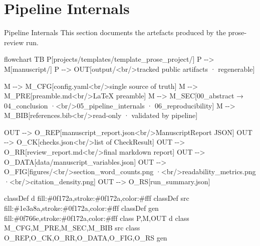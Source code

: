 \documentclass[
  ignorenonframetext,
]{beamer}
\author{\texorpdfstring{}{}}
\date{}
\newenvironment{Shaded}{}{}
\newcommand{\NormalTok}[1]{#1}
\begin{document}
\section{Pipeline Internals}\label{sec:pipeline_internals}

\begin{frame}{Pipeline Internals}
This section documents the artefacts produced by the prose-review run.

\begin{Shaded}
\begin{Highlighting}[]
\NormalTok{flowchart TB}
\NormalTok{    P[projects/templates/template\_prose\_project/]}
\NormalTok{    P {-}{-}\textgreater{} M[manuscript/]}
\NormalTok{    P {-}{-}\textgreater{} OUT[output/\textless{}br/\textgreater{}tracked public artifacts · regenerable]}

\NormalTok{    M {-}{-}\textgreater{} M\_CFG[config.yaml\textless{}br/\textgreater{}single source of truth]}
\NormalTok{    M {-}{-}\textgreater{} M\_PRE[preamble.md\textless{}br/\textgreater{}LaTeX preamble]}
\NormalTok{    M {-}{-}\textgreater{} M\_SEC[00\_abstract → 04\_conclusion ·\textless{}br/\textgreater{}05\_pipeline\_internals · 06\_reproducibility]}
\NormalTok{    M {-}{-}\textgreater{} M\_BIB[references.bib\textless{}br/\textgreater{}read{-}only · validated by pipeline]}

\NormalTok{    OUT {-}{-}\textgreater{} O\_REP[manuscript\_report.json\textless{}br/\textgreater{}ManuscriptReport JSON]}
\NormalTok{    OUT {-}{-}\textgreater{} O\_CK[checks.json\textless{}br/\textgreater{}list of CheckResult]}
\NormalTok{    OUT {-}{-}\textgreater{} O\_RR[review\_report.md\textless{}br/\textgreater{}final markdown report]}
\NormalTok{    OUT {-}{-}\textgreater{} O\_DATA[data/manuscript\_variables.json]}
\NormalTok{    OUT {-}{-}\textgreater{} O\_FIG[figures/\textless{}br/\textgreater{}section\_word\_counts.png ·\textless{}br/\textgreater{}readability\_metrics.png ·\textless{}br/\textgreater{}citation\_density.png]}
\NormalTok{    OUT {-}{-}\textgreater{} O\_RS[run\_summary.json]}

\NormalTok{    classDef d fill:\#0f172a,stroke:\#0f172a,color:\#fff}
\NormalTok{    classDef src fill:\#1e3a8a,stroke:\#0f172a,color:\#fff}
\NormalTok{    classDef gen fill:\#0f766e,stroke:\#0f172a,color:\#fff}
\NormalTok{    class P,M,OUT d}
\NormalTok{    class M\_CFG,M\_PRE,M\_SEC,M\_BIB src}
\NormalTok{    class O\_REP,O\_CK,O\_RR,O\_DATA,O\_FIG,O\_RS gen}
\end{Highlighting}
\end{Shaded}
\end{frame}
\end{document}
